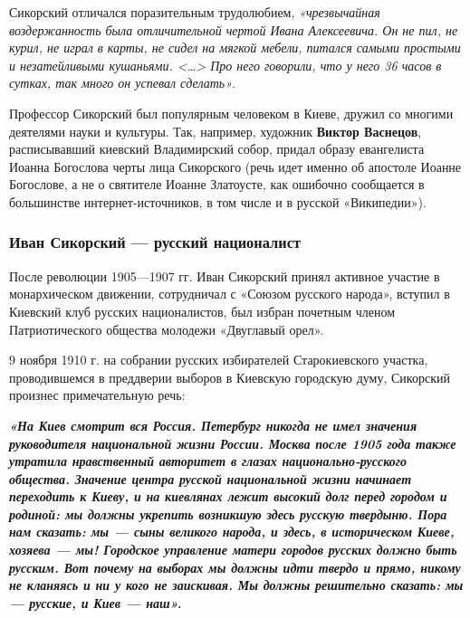 Сикорский отличался поразительным трудолюбием, \emph{«чрезвычайная воздержанность
была отличительной чертой Ивана Алексеевича. Он не пил, не курил, не играл в
карты, не сидел на мягкой мебели, питался самыми простыми и незатейливыми
кушаньями. <…> Про него говорили, что у него 36 часов в сутках, так много он
успевал сделать»}.

Профессор Сикорский был популярным человеком в Киеве, дружил со многими
деятелями науки и культуры. Так, например, художник \textbf{Виктор Васнецов},
расписывавший киевский Владимирский собор, придал образу евангелиста Иоанна
Богослова черты лица Сикорского (речь идет именно об апостоле Иоанне Богослове,
а не о святителе Иоанне Златоусте, как ошибочно сообщается в большинстве
интернет-источников, в том числе и в русской «Википедии»).

\subsubsection{Иван Сикорский — русский националист}

После революции 1905—1907 гг. Иван Сикорский принял активное участие в
монархическом движении, сотрудничал с «Союзом русского народа», вступил в
Киевский клуб русских националистов, был избран почетным членом Патриотического
общества молодежи «Двуглавый орел».

9 ноября 1910 г. на собрании русских избирателей Старокиевского участка,
проводившемся в преддверии выборов в Киевскую городскую думу, Сикорский
произнес примечательную речь:

\begin{leftbar}
  \begingroup
        \em\Large\color{blue}\bfseries
«На Киев смотрит вся Россия. Петербург никогда не имел значения руководителя
        национальной жизни России. Москва после 1905 года также утратила
        нравственный авторитет в глазах национально-русского общества. Значение
        центра русской национальной жизни начинает переходить к Киеву, и на
        киевлянах лежит высокий долг перед городом и родиной: мы должны
        укрепить возникшую здесь русскую твердыню. Пора нам сказать: мы — сыны
        великого народа, и здесь, в историческом Киеве, хозяева — мы! Городское
        управление матери городов русских должно быть русским. Вот почему на
        выборах мы должны идти твердо и прямо, никому не кланяясь и ни у кого
        не заискивая. Мы должны решительно сказать: мы — русские, и Киев —
        наш».
  \endgroup
\end{leftbar}

